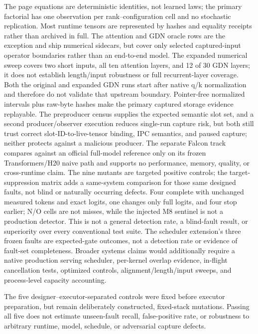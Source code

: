 \documentclass{article}
\begin{document}
The page equations are deterministic identities, not learned laws; the primary
factorial has one observation per rank--configuration cell and no stochastic
replication.
Most runtime tensors are represented by hashes and equality receipts rather
than archived in full.  The attention and GDN oracle rows are the exception
and ship numerical sidecars, but cover only selected captured-input operator
boundaries rather than an end-to-end model.  The expanded numerical sweep covers two
short inputs, all ten attention layers, and 12 of 30 GDN layers; it does not
establish length/input robustness or full recurrent-layer coverage.  Both the
original and expanded GDN runs start after native q/k normalization and
therefore do not validate that upstream boundary.  Pointer-free normalized
intervals plus raw-byte hashes make the primary captured storage evidence
replayable.  The preproducer census supplies the expected semantic slot set,
and a second producer/observer execution reduces single-run capture risk, but
both still trust correct slot-ID-to-live-tensor binding, IPC semantics, and paused
capture; neither protects against a malicious producer.  The separate Falcon
track compares against an official full-model reference only on its frozen
Transformers/H20 naive path and supports no performance, memory, quality, or
cross-runtime claim.  The nine mutants are targeted
positive controls; the target-suppression matrix adds a same-system comparison
for those same designed faults, not blind or naturally occurring defects.
Four complete with unchanged measured tokens and exact logits, one changes only full logits,
and four stop earlier; N/O cells are not misses, while the injected M8 sentinel
is not a production detector.  This is not a general detection rate, a
blind-fault result, or superiority over every conventional test suite.  The scheduler
extension's three frozen faults are expected-gate outcomes, not a detection
rate or evidence of fault-set completeness.  Broader systems claims would
additionally require a native production serving scheduler, per-kernel overlap
evidence, in-flight cancellation tests, optimized controls,
alignment/length/input sweeps, and process-level capacity accounting.

The five designer--executor-separated controls were fixed before executor
preparation, but remain deliberately constructed, fixed-stack mutations.  Passing all five does
not estimate unseen-fault recall, false-positive rate, or robustness to arbitrary
runtime, model, schedule, or adversarial capture defects.
\end{document}

